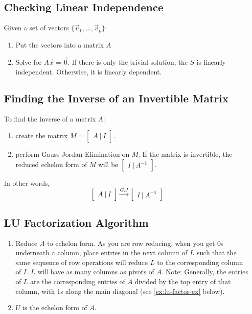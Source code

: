 \documentclass[a4paper,12pt]{article}
\theoremstyle{definition}
\theoremstyle{definition}
\newcommand{\mateq}[3]{#1#2 = #3}
\newcommand{\mateqaxo}{\mateq{A}{\vec{x}}{\vec{0}}}
\newcommand{\finitevecs}[2]{#1_1,\ldots,#1_#2}
\newcommand{\finitevecsset}[2]{\{\finitevecs{#1}{#2}\}}
\begin{document}
	\subsection{Checking Linear Independence}
	\label{sec:lin-indep-check}
	
	Given a set of vectors $\finitevecsset{\vec{v}}{p}$:
	
	\begin{enumerate}
		\item Put the vectors into a matrix $A$
		
		\item Solve for $\mateqaxo$. If there is only the trivial solution, the $S$ is linearly independent. Otherwise, it is linearly dependent.
	\end{enumerate}
	
	\subsection{Finding the Inverse of an Invertible Matrix}
	\label{sec:mat-inverse}
	To find the inverse of a matrix $A$:
	\begin{enumerate}
		\item create the matrix
		$
		M =
		\begin{bmatrix}
			A \:|\: I
		\end{bmatrix}$.
		
		\item perform Gauss-Jordan Elimination on $M$. If the matrix is invertible, the reduced echelon form of $M$ will be
		$
		\begin{bmatrix}
			I \:|\: A^{-1}
		\end{bmatrix}$.
	\end{enumerate}
	
	In other words,
	\begin{equation*}
		\begin{bmatrix}
			A \:|\: I
		\end{bmatrix}
		\xrightarrow{G.J}
		\begin{bmatrix}
			I \:|\: A^{-1}
		\end{bmatrix}
	\end{equation*}
	
	\subsection{LU Factorization Algorithm}
	\label{sec:lu-factorization}
	\begin{enumerate}
		\item Reduce $A$ to echelon form. As you are row reducing, when you get 0s underneath a column, place entries in the next column of $L$ such that the same sequence of row operations will reduce $L$ to the corresponding column of $I$. $L$ will have as many columns as pivots of $A$. Note: Generally, the entries of $L$ are the corresponding entries of $A$ divided by the top entry of that column, with 1s along the main diagonal (see \autoref{ex:lu-factor-ex} below).
		
		\item $U$ is the echelon form of $A$.
	\end{enumerate}
	
\end{document}
